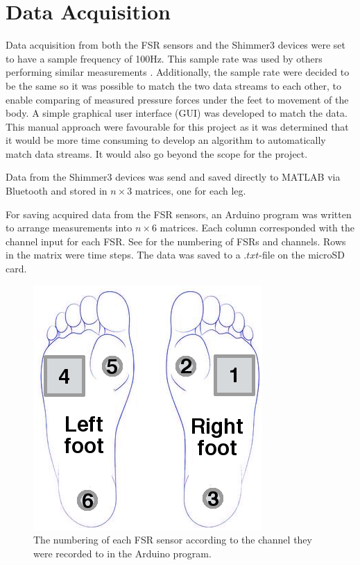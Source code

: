 \section{Data Acquisition}

Data acquisition from both the FSR sensors and the Shimmer3 devices were set to have a sample frequency of 100Hz. This sample rate was used by others performing similar measurements \cite{Verkerke2005, Byun2016, Sherwani2016}. Additionally, the sample rate were decided to be the same so it was possible to match the two data streams to each other, to enable comparing of measured pressure forces under the feet to movement of the body. A simple graphical user interface (GUI) was developed to match the data. This manual approach were favourable for this project as it was determined that it would be more time consuming to develop an algorithm to automatically match data streams. It would also go beyond the scope for the project.

Data from the Shimmer3 devices was send and saved directly to MATLAB via Bluetooth and stored in $n\times3$ matrices, one for each leg.

For saving acquired data from the FSR sensors, an Arduino program was written to arrange measurements into $n\times6$ matrices. Each column corresponded with the channel input for each FSR. See  for the numbering of FSRs and channels. Rows in the matrix were time steps. The data was saved to a $.txt$-file on the microSD card. 

\begin{figure}[H]
	\includegraphics[width=.3\textwidth]{figures/FSRNumbering}
	\caption{The numbering of each FSR sensor according to the channel they were recorded to in the Arduino program.}
	\label{fig:FSRNumbering}  %
\end{figure}



